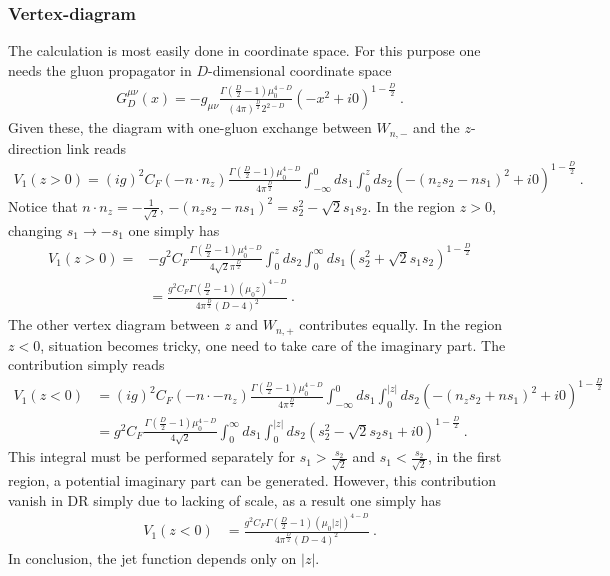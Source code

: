 \documentclass[a4paper,11pt]{article}
\begin{document}
\subsubsection{Vertex-diagram}
The calculation is most easily done in coordinate space. For this purpose one needs the gluon propagator in $D$-dimensional coordinate space
\begin{align}
G_D^{\mu \nu}(x)=-g_{\mu \nu} \frac{\Gamma(\frac{D}{2}-1)\mu_0^{4-D}}{(4\pi)^{\frac{D}{2}}2^{2-D}}(-x^2+i0)^{1-\frac{D}{2}} \ .
\end{align}
Given these, the diagram with one-gluon exchange between $W_{n,-}$ and the $z$-direction link reads
\begin{align}
V_1(z>0)=(ig)^2C_F(-n\cdot n_z) \frac{\Gamma(\frac{D}{2}-1)\mu_0^{4-D}}{4\pi^{\frac{D}{2}}}\int_{-\infty}^{0} ds_1 \int_{0}^{z} ds_2 (-(n_zs_2-ns_1)^2+i0)^{1-\frac{D}{2}} \ .
\end{align}
Notice that $n\cdot n_z=-\frac{1}{\sqrt{2}}$, $-(n_zs_2-ns_1)^2=s_2^2-\sqrt{2}s_1s_2$.  In the region $z>0$, changing $s_1 \rightarrow -s_1$ one simply has
\begin{align}
V_1(z>0)=&-g^2C_F\frac{\Gamma(\frac{D}{2}-1)\mu_0^{4-D}}{4\sqrt{2}\pi^{\frac{D}{2}}}\int_{0}^{z} ds_2 \int_{0}^{\infty} ds_1(s_2^2+\sqrt{2}s_1s_2)^{1-\frac{D}{2}} \nonumber \\ 
&=\frac{g^2C_F\Gamma(\frac{D}{2}-1)(\mu_0 z)^{4-D}}{4\pi^{\frac{D}{2}}(D-4)^2} \ .
\end{align}
The other vertex diagram between $z$ and $W_{n,+}$ contributes equally.  In the region $z<0$, situation becomes tricky, one need to take care of the imaginary part. The contribution simply reads
\begin{align}
V_1(z<0)&=(ig)^2C_F(-n\cdot -n_z) \frac{\Gamma(\frac{D}{2}-1)\mu_0^{4-D}}{4\pi^{\frac{D}{2}}}\int_{-\infty}^{0} ds_1 \int_{0}^{|z|} ds_2 (-(n_zs_2+ns_1)^2+i0)^{1-\frac{D}{2}} \nonumber \\ 
&=g^2C_F\frac{\Gamma(\frac{D}{2}-1)\mu_0^{4-D}}{4\sqrt{2}}\int_{0}^{\infty}ds_1\int_{0}^{|z|} ds_2(s_2^2-\sqrt{2}s_2s_1+i0)^{1-\frac{D}{2}} \ .
\end{align}
This integral must be performed separately for $s_1>\frac{s_2}{\sqrt{2}}$ and $s_1<\frac{s_2}{\sqrt{2}}$, in the first region, a potential imaginary part can be generated. However, this contribution vanish in DR simply due to lacking of scale, as a result one simply has
\begin{align}
V_1(z<0)&=\frac{g^2C_F\Gamma(\frac{D}{2}-1)(\mu_0 |z|)^{4-D}}{4\pi^{\frac{D}{2}}(D-4)^2} \ .
\end{align}
In conclusion, the jet function depends only on $|z|$.
\end{document}
